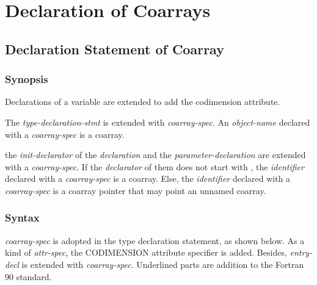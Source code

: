 \section{Declaration of Coarrays}
\label{sec:Declaration of Coarrays}



\subsection{Declaration Statement of Coarray}
\label{sec:Declaration Statement of Coarray}

\subsubsection*{Synopsis}
Declarations of a variable are extended to add the codimension attribute.

{\onlyF}
The {\it type-declaration-stmt} is extended with {\it coarray-spec}.
An {\it object-name} declared with a {\it coarray-spec} is a coarray.

{\onlyC} 
the {\it init-declarator} of the {\it declaration} and 
the {\it parameter-declaration} are extended with a {\it coarray-spec}.
If the {\it declarator} of them does not start with {\tt *},
the {\it identifier} declared with a {\it coarray-spec} is a coarray.
Else, 
the {\it identifier} declared with a {\it coarray-spec} is a coarray pointer
that may point an unnamed coarray.


\subsubsection*{Syntax \onlyF}
{\it coarray-spec} is adopted in the type declaration statement, as shown below.
As a kind of {\it attr-spec}, the CODIMENSION attribute specifier is added.
Besides, {\it entry-decl} is extended with {\it coarray-spec}.
Underlined parts are addition to the Fortran 90 standard.

